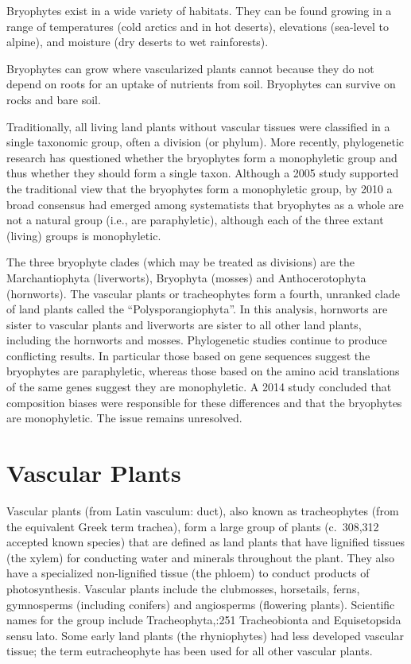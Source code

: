 Bryophytes exist in a wide variety of habitats. They can be found growing in a range of temperatures (cold arctics and in hot deserts), elevations (sea-level to alpine), and moisture (dry deserts to wet rainforests).

Bryophytes can grow where vascularized plants cannot because they do not depend on roots for an uptake of nutrients from soil. Bryophytes can survive on rocks and bare soil.

Traditionally, all living land plants without vascular tissues were classified in a single taxonomic group, often a division (or phylum). More recently, phylogenetic research has questioned whether the bryophytes form a monophyletic group and thus whether they should form a single taxon. Although a 2005 study supported the traditional view that the bryophytes form a monophyletic group, by 2010 a broad consensus had emerged among systematists that bryophytes as a whole are not a natural group (i.e., are paraphyletic), although each of the three extant (living) groups is monophyletic.

The three bryophyte clades (which may be treated as divisions) are the Marchantiophyta (liverworts), Bryophyta (mosses) and Anthocerotophyta (hornworts). The vascular plants or tracheophytes form a fourth, unranked clade of land plants called the ``Polysporangiophyta''. In this analysis, hornworts are sister to vascular plants and liverworts are sister to all other land plants, including the hornworts and mosses. Phylogenetic studies continue to produce conflicting results. In particular those based on gene sequences suggest the bryophytes are paraphyletic, whereas those based on the amino acid translations of the same genes suggest they are monophyletic. A 2014 study concluded that composition biases were responsible for these differences and that the bryophytes are monophyletic. The issue remains unresolved.

\hypertarget{vascular-plants}{%
\section{Vascular Plants}\label{vascular-plants}}

Vascular plants (from Latin vasculum: duct), also known as tracheophytes (from the equivalent Greek term trachea), form a large group of plants (c.~308,312 accepted known species) that are defined as land plants that have lignified tissues (the xylem) for conducting water and minerals throughout the plant. They also have a specialized non-lignified tissue (the phloem) to conduct products of photosynthesis. Vascular plants include the clubmosses, horsetails, ferns, gymnosperms (including conifers) and angiosperms (flowering plants). Scientific names for the group include Tracheophyta,:251 Tracheobionta and Equisetopsida sensu lato. Some early land plants (the rhyniophytes) had less developed vascular tissue; the term eutracheophyte has been used for all other vascular plants.


